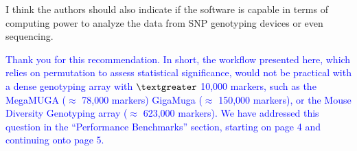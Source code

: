 \documentclass[11pt]{article}
\newcommand{\ReviewerQuestion}[1]{
  \vspace{5pt}\goodbreak
  \noindent\fbox{Reviewer:} #1
  \normalfont\par
}
\newcommand{\Response}[1]{
  \goodbreak
  \textcolor{blue}{#1}
  \normalfont\par
}
\begin{document}
\ReviewerQuestion{
  I think the authors should also indicate if the software is capable in terms of computing power to analyze the data from SNP genotyping devices or even sequencing.
}

\Response{
  Thank you for this recommendation.
  In short, the workflow presented here, which relies on permutation to assess statistical significance, would not be practical with a dense genotyping array with $\textgreater$ 10,000 markers, such as the MegaMUGA ($\approx$ 78,000 markers) GigaMuga ($\approx$ 150,000 markers), or the Mouse Diversity Genotyping array ($\approx$ 623,000 markers).
  We have addressed this question in the ``Performance Benchmarks'' section, starting on page 4 and continuing onto page 5.
}
\end{document}
